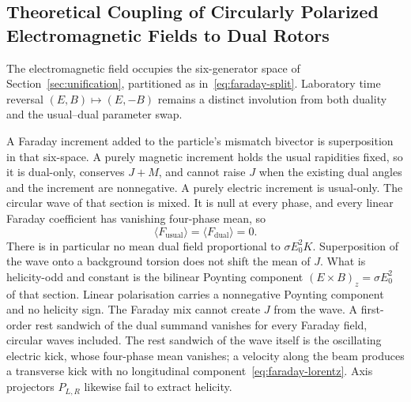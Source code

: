 \documentclass[a4paper]{article}
\begin{document}
\subsection{Theoretical Coupling of Circularly Polarized Electromagnetic Fields to Dual Rotors}

The electromagnetic field occupies the six-generator space of Section~\ref{sec:unification}, partitioned as in~\eqref{eq:faraday-split}. Laboratory time reversal $(E,B)\mapsto(E,-B)$ remains a distinct involution from both duality and the usual--dual parameter swap.

A Faraday increment added to the particle's mismatch bivector is superposition in that six-space. A purely magnetic increment holds the usual rapidities fixed, so it is dual-only, conserves $J+M$, and cannot raise $J$ when the existing dual angles and the increment are nonnegative. A purely electric increment is usual-only. The circular wave of that section is mixed. It is null at every phase, and every linear Faraday coefficient has vanishing four-phase mean, so
\[
\langle F_{\mathrm{usual}}\rangle=\langle F_{\mathrm{dual}}\rangle=0.
\]
There is in particular no mean dual field proportional to $\sigma E_0^2 K$. Superposition of the wave onto a background torsion does not shift the mean of $J$. What is helicity-odd and constant is the bilinear Poynting component $(E\times B)_z=\sigma E_0^2$ of that section. Linear polarisation carries a nonnegative Poynting component and no helicity sign. The Faraday mix cannot create $J$ from the wave. A first-order rest sandwich of the dual summand vanishes for every Faraday field, circular waves included. The rest sandwich of the wave itself is the oscillating electric kick, whose four-phase mean vanishes; a velocity along the beam produces a transverse kick with no longitudinal component~\eqref{eq:faraday-lorentz}. Axis projectors $P_{L,R}$ likewise fail to extract helicity.
\end{document}
